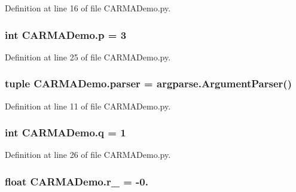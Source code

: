 Definition at line 16 of file C\-A\-R\-M\-A\-Demo.\-py.

\hypertarget{namespace_c_a_r_m_a_demo_adf3b3082a9cb9203add8b494f5932ba8}{
\subsubsection[{p}]{\setlength{\rightskip}{0pt plus 5cm}int C\-A\-R\-M\-A\-Demo.\-p = 3}}\label{namespace_c_a_r_m_a_demo_adf3b3082a9cb9203add8b494f5932ba8}


Definition at line 25 of file C\-A\-R\-M\-A\-Demo.\-py.

\hypertarget{namespace_c_a_r_m_a_demo_a1fd1c8854d7c66e2b19f47d6aad706ef}{
\subsubsection[{parser}]{\setlength{\rightskip}{0pt plus 5cm}tuple C\-A\-R\-M\-A\-Demo.\-parser = argparse.\-Argument\-Parser()}}\label{namespace_c_a_r_m_a_demo_a1fd1c8854d7c66e2b19f47d6aad706ef}


Definition at line 11 of file C\-A\-R\-M\-A\-Demo.\-py.

\hypertarget{namespace_c_a_r_m_a_demo_a71450e798960cbdb932b7f4721305832}{
\subsubsection[{q}]{\setlength{\rightskip}{0pt plus 5cm}int C\-A\-R\-M\-A\-Demo.\-q = 1}}\label{namespace_c_a_r_m_a_demo_a71450e798960cbdb932b7f4721305832}


Definition at line 26 of file C\-A\-R\-M\-A\-Demo.\-py.

\hypertarget{namespace_c_a_r_m_a_demo_aa32ceb76d602a0d157916cf91ad6377c}{
\subsubsection[{r\-\_\-1}]{\setlength{\rightskip}{0pt plus 5cm}float C\-A\-R\-M\-A\-Demo.\-r\-\_ = -\/0.}}\label{namespace_c_a_r_m_a_demo_aa32ceb76d602a0d157916cf91ad6377c}


